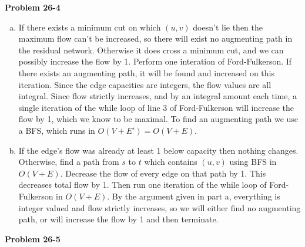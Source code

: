 \documentclass{article}
\begin{document}
\noindent\textbf{Problem 26-4}\\

\begin{enumerate}[a.]
\item If there exists a minimum cut on which $(u,v)$ doesn't lie then the maximum flow can't be increased, so there will exist no augmenting path in the residual network.  Otherwise it does cross a minimum cut, and we can possibly increase the flow by 1.   Perform one interation of Ford-Fulkerson.  If there exists an augmenting path, it will be found and increased on this iteration.  Since the edge capacities are integers, the flow values are all integral.  Since flow strictly increases, and by an integral amount each time, a single iteration of the while loop of line 3 of Ford-Fulkerson will increase the flow by 1, which we know to be maximal.  To find an augmenting path we use a BFS, which runs in $O(V+E') = O(V+E)$. 

\item If the edge's flow was already at least 1 below capacity then nothing changes.  Otherwise, find a path from $s$ to $t$ which contains $(u,v)$ using BFS in $O(V+E)$.  Decrease the flow of every edge on that path by 1.  This decreases total flow by 1.  Then run one iteration of the while loop of Ford-Fulkerson in $O(V+E)$.  By the argument given in part a, everything is integer valued and flow strictly increases, so we will either find no augmenting path, or will increase the flow by 1 and then terminate. 
\end{enumerate} 

\noindent\textbf{Problem 26-5}\\
\end{document}
